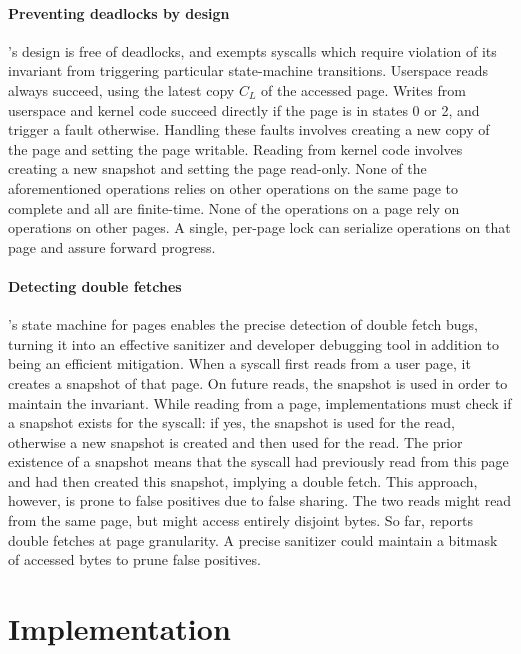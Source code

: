 \documentclass[letterpaper,twocolumn,10pt, anonymous]{article}
\begin{document}
\paragraph{Preventing deadlocks by design}
\tiktok's design is free of deadlocks, and exempts syscalls which 
require violation of its invariant from triggering particular 
state-machine transitions.
Userspace reads always succeed, using the latest copy $C_L$ of the
accessed page.
Writes from userspace and kernel code succeed directly if the 
page is in states 0 or 2, and trigger a fault otherwise.
Handling these faults involves creating a new copy of the page and
setting the page writable. 
Reading from kernel code involves creating a new snapshot and 
setting the page read-only.
None of the aforementioned operations relies on other operations 
on the same page to complete and all are finite-time.
None of the operations on a page rely on operations on other pages.
A single, per-page lock can serialize operations on that page
and assure forward progress.

\paragraph{Detecting double fetches}
\tiktok's state machine for pages enables the precise detection of double fetch
bugs, turning it into an effective sanitizer and developer debugging tool in
addition to being an efficient mitigation.
When a syscall first reads from a user page, it creates a snapshot 
of that page.
On future reads, the snapshot is used in order to maintain the 
invariant.
While reading from a page, implementations must check 
if a snapshot exists for the syscall: if yes, the snapshot is used
for the read, otherwise a new snapshot is created and then used 
for the read. 
The prior existence of a snapshot means that the syscall had previously
read from this page and had then created this snapshot, implying a double 
fetch.
This approach, however, is prone to false positives due to false sharing.
The two reads might read from the same page, but might access entirely 
disjoint bytes.
So far, \tiktok reports double fetches at page granularity. 
A precise sanitizer could maintain a bitmask of accessed bytes to
prune false positives.


\section{\tiktok Implementation}
\label{sec:impl}
\end{document}
